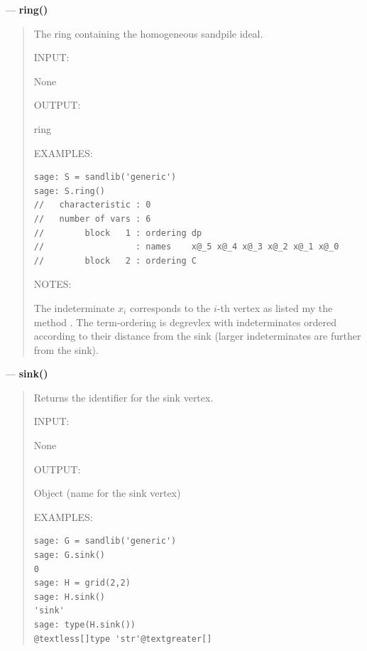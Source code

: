 \documentclass[letterpaper,10pt,english]{manual}
\begin{document}
---
\hypertarget{ring}{}
\textbf{ring()}
\begin{quote}

The ring containing the homogeneous sandpile ideal.

INPUT:

None

OUTPUT:

ring

EXAMPLES:

\begin{Verbatim}[commandchars=@\[\]]
sage: S = sandlib('generic')
sage: S.ring()
//   characteristic : 0
//   number of vars : 6
//        block   1 : ordering dp
//                  : names    x@_5 x@_4 x@_3 x@_2 x@_1 x@_0
//        block   2 : ordering C
\end{Verbatim}

NOTES:

The indeterminate $x_i$ corresponds to the $i$-th vertex as listed my
the method . The term-ordering is degrevlex with
indeterminates ordered according to their distance from the sink (larger
indeterminates are further from the sink).
\end{quote}

---
\hypertarget{sink}{}
\textbf{sink()}
\begin{quote}

Returns the identifier for the sink vertex.

INPUT:

None

OUTPUT:

Object (name for the sink vertex)

EXAMPLES:

\begin{Verbatim}[commandchars=@\[\]]
sage: G = sandlib('generic')
sage: G.sink()
0
sage: H = grid(2,2)
sage: H.sink()
'sink'
sage: type(H.sink())
@textless[]type 'str'@textgreater[]
\end{Verbatim}
\end{quote}
\end{document}
